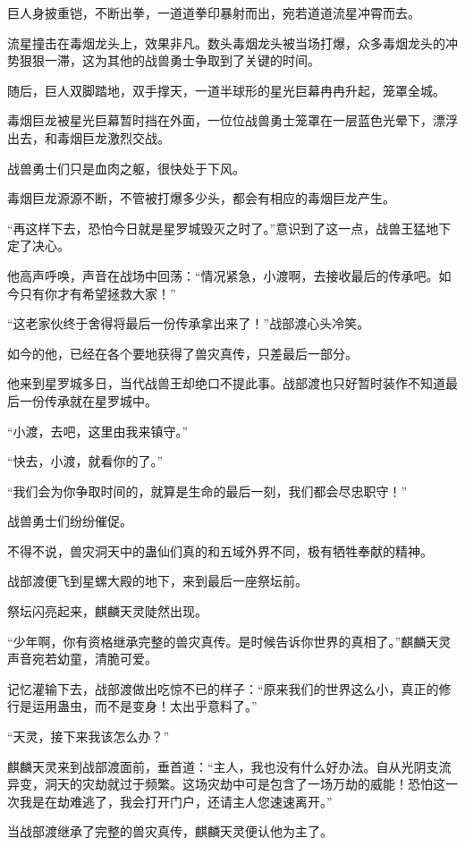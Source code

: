 \begin{this_body}
巨人身披重铠，不断出拳，一道道拳印暴射而出，宛若道道流星冲霄而去。

流星撞击在毒烟龙头上，效果非凡。数头毒烟龙头被当场打爆，众多毒烟龙头的冲势狠狠一滞，这为其他的战兽勇士争取到了关键的时间。

随后，巨人双脚踏地，双手撑天，一道半球形的星光巨幕冉冉升起，笼罩全城。

毒烟巨龙被星光巨幕暂时挡在外面，一位位战兽勇士笼罩在一层蓝色光晕下，漂浮出去，和毒烟巨龙激烈交战。

战兽勇士们只是血肉之躯，很快处于下风。

毒烟巨龙源源不断，不管被打爆多少头，都会有相应的毒烟巨龙产生。

“再这样下去，恐怕今日就是星罗城毁灭之时了。”意识到了这一点，战兽王猛地下定了决心。

他高声呼唤，声音在战场中回荡：“情况紧急，小渡啊，去接收最后的传承吧。如今只有你才有希望拯救大家！”

“这老家伙终于舍得将最后一份传承拿出来了！”战部渡心头冷笑。

如今的他，已经在各个要地获得了兽灾真传，只差最后一部分。

他来到星罗城多日，当代战兽王却绝口不提此事。战部渡也只好暂时装作不知道最后一份传承就在星罗城中。

“小渡，去吧，这里由我来镇守。”

“快去，小渡，就看你的了。”

“我们会为你争取时间的，就算是生命的最后一刻，我们都会尽忠职守！”

战兽勇士们纷纷催促。

不得不说，兽灾洞天中的蛊仙们真的和五域外界不同，极有牺牲奉献的精神。

战部渡便飞到星螺大殿的地下，来到最后一座祭坛前。

祭坛闪亮起来，麒麟天灵陡然出现。

“少年啊，你有资格继承完整的兽灾真传。是时候告诉你世界的真相了。”麒麟天灵声音宛若幼童，清脆可爱。

记忆灌输下去，战部渡做出吃惊不已的样子：“原来我们的世界这么小，真正的修行是运用蛊虫，而不是变身！太出乎意料了。”

“天灵，接下来我该怎么办？”

麒麟天灵来到战部渡面前，垂首道：“主人，我也没有什么好办法。自从光阴支流异变，洞天的灾劫就过于频繁。这场灾劫中可是包含了一场万劫的威能！恐怕这一次我是在劫难逃了，我会打开门户，还请主人您速速离开。”

当战部渡继承了完整的兽灾真传，麒麟天灵便认他为主了。


\end{this_body}
